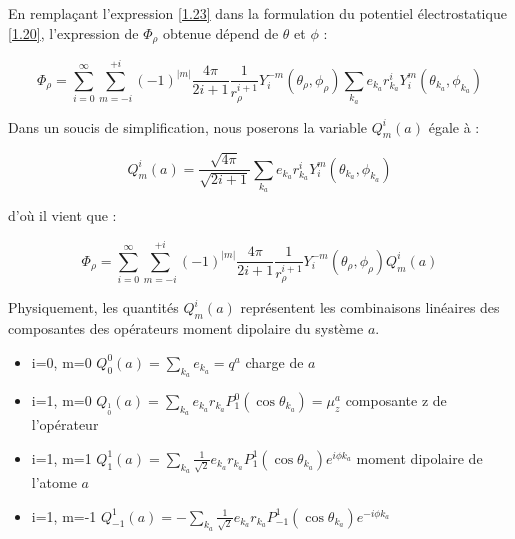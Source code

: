 \documentclass[12pt,a4paper]{book}
\begin{document}
	En remplaçant l'expression \ref{1.23} dans la formulation du potentiel électrostatique \ref{1.20}, l'expression de $\Phi_{\rho}$ obtenue dépend de $\theta$ et $\phi$ : 
	
	\begin{equation}
	\Phi_{\rho} = \sum_{i=0}^{\infty} \sum_{m=-i}^{+i} (-1)^{|m|}\frac{4\pi}{2i +1} \frac{1}{r_{\rho}^{i+1}} Y_{i}^{-m} (\theta_{\rho},\phi_{\rho}) \sum_{k_{a}} e_{k_{a}}r^{i}_{k_{a}} Y^{m}_{i} (\theta_{k_{a}}, \phi_{k_{a}})
	\end{equation}
	
	Dans un soucis de simplification, nous poserons la variable $Q_{m}^{i}(a)$ égale à : 
	
	\begin{equation}
	Q_{m}^{i}(a)= \frac{\sqrt{4\pi}}{\sqrt{2i + 1}} \sum_{k_{a}} e_{k_{a}}r_{k_{a}}^{i} Y_{i}^{m} (\theta_{k_{a}}, \phi_{k_{a}}) \label{1.25}
	\end{equation}
	
	\noindent d'où il vient que :
	
	\begin{equation}
	\Phi_{\rho} = \sum_{i=0}^{\infty} \sum_{m=-i}^{+i} (-1)^{|m|} \frac{4\pi}{2i +1} \frac{1}{r_{\rho}^{i+1}} Y_{i}^{-m} (\theta_{\rho},\phi_{\rho})Q_{m}^{i}(a)
	\end{equation}
	
	Physiquement, les quantités $Q_{m}^{i}(a)$ représentent les combinaisons linéaires des composantes des opérateurs moment dipolaire du système $a$. 
	
	\begin{itemize}
		\item i=0, m=0 \hspace{0.9cm} $Q_{0}^{0}(a) = \sum_{k_{a}} e_{k_{a}} = q^{a}$ \hspace{3.5cm} charge de $a$
		\item i=1, m=0 \hspace{0.9cm} $Q_{_{0}^{1}}(a)= \sum_{k_{a}} e_{k_{a}} r_{k_{a}} P^{0}_{1} (\cos\theta_{k_{a}}) = \mu_{z}^{a}$ \hspace{1cm} composante z de l'opérateur	
		\item i=1, m=1 \hspace{0.9cm} $Q_{1}^{1}(a)= \sum_{k_{a}} \frac{1}{\sqrt{2}}e_{k_{a}} r_{k_{a}} P^{1}_{1} (\cos\theta_{k_{a}}) e^{i\phi k_{a}}$ \hspace{0.6cm} moment dipolaire de l'atome $a$
		\item i=1, m=-1 \hspace{0.9cm} $Q_{-1}^{1}(a) = -\sum_{k_{a}} \frac{1}{\sqrt{2}}e_{k_{a}} r_{k_{a}} P^{1}_{-1} (\cos\theta_{k_{a}}) e^{-i\phi k_{a}}$
	\end{itemize}
	
\end{document}
